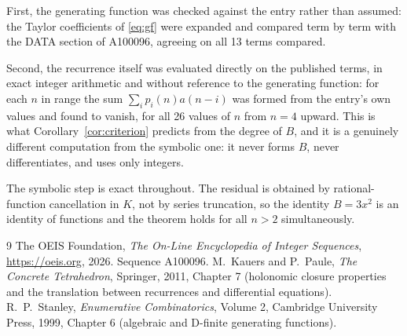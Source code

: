 \documentclass[11pt,a4paper]{article}
\theoremstyle{plain}
\theoremstyle{definition}
\begin{document}
First, the generating function was checked against the entry rather than assumed: the
Taylor coefficients of \eqref{eq:gf} were expanded and compared term by term with the DATA
section of A100096, agreeing on all 13 terms compared.

Second, the recurrence itself was evaluated directly on the published terms, in exact
integer arithmetic and without reference to the generating function: for each $n$ in range
the sum $\sum_{i}p_{i}(n)a(n-i)$ was formed from the entry's own values and found to
vanish, for all 26 values of $n$ from $n=4$ upward. This is what
Corollary~\ref{cor:criterion} predicts from the degree of $B$, and it is a genuinely
different computation from the symbolic one: it never forms $B$, never differentiates, and
uses only integers.

The symbolic step is exact throughout. The residual is obtained by rational-function
cancellation in $K$, not by series truncation, so the identity $B=3 x^{2}$ is an
identity of functions and the theorem holds for all $n>2$ simultaneously.

\begin{thebibliography}{9}
 The OEIS Foundation, \emph{The On-Line Encyclopedia of Integer Sequences},
\url{https://oeis.org}, 2026. Sequence A100096.
 M.~Kauers and P.~Paule, \emph{The Concrete Tetrahedron}, Springer, 2011,
Chapter 7 (holonomic closure properties and the translation between recurrences and
differential equations).
 R.~P.~Stanley, \emph{Enumerative Combinatorics}, Volume 2, Cambridge
University Press, 1999, Chapter 6 (algebraic and D-finite generating functions).
\end{thebibliography}
\end{document}
